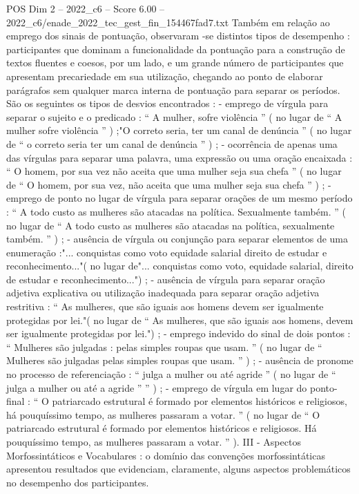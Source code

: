 \begin{textsample}{POS Dim 2 – 2022\_c6 – Score 6.00 – 2022\_c6/enade\_2022\_tec\_gest\_fin\_154467fad7.txt}
Também em relação ao emprego dos sinais de pontuação, observaram -se distintos tipos de desempenho : participantes que dominam a funcionalidade da pontuação para a construção de textos fluentes e coesos, por um lado, e um grande número de participantes que apresentam precariedade em sua utilização, chegando ao ponto de elaborar parágrafos sem qualquer marca interna de pontuação para separar os períodos.
São os seguintes os tipos de desvios encontrados : - emprego de vírgula para separar o sujeito e o predicado : “ A mulher, sofre violência ” ( no lugar de “ A mulher sofre violência ” ) ;"O correto seria, ter um canal de denúncia ” ( no lugar de “ o correto seria ter um canal de denúncia ” ) ; - ocorrência de apenas uma das vírgulas para separar uma palavra, uma expressão ou uma oração encaixada : “ O homem, por sua vez não aceita que uma mulher seja sua chefa ” ( no lugar de “ O homem, por sua vez, não aceita que uma mulher seja sua chefa ” ) ; - emprego de ponto no lugar de vírgula para separar orações de um mesmo período : “ A todo custo as mulheres são atacadas na política.
Sexualmente também. ” ( no lugar de “ A todo custo as mulheres são atacadas na política, sexualmente também. ” ) ; - ausência de vírgula ou conjunção para separar elementos de uma enumeração :"... conquistas como voto equidade salarial direito de estudar e reconhecimento..."( no lugar de"... conquistas como voto, equidade salarial, direito de estudar e reconhecimento...") ; - ausência de vírgula para separar oração adjetiva explicativa ou utilização inadequada para separar oração adjetiva restritiva : “ As mulheres, que são iguais aos homens devem ser igualmente protegidas por lei."( no lugar de “ As mulheres, que são iguais aos homens, devem ser igualmente protegidas por lei.") ; - emprego indevido do sinal de dois pontos : “ Mulheres são julgadas : pelas simples roupas que usam. ” ( no lugar de “ Mulheres são julgadas pelas simples roupas que usam. ” ) ; - ausência de pronome no processo de referenciação : “ julga a mulher ou até agride ” ( no lugar de “ julga a mulher ou até a agride ” ” ) ; - emprego de vírgula em lugar do ponto-final : “ O patriarcado estrutural é formado por elementos históricos e religiosos, há pouquíssimo tempo, as mulheres passaram a votar. ” ( no lugar de “ O patriarcado estrutural é formado por elementos históricos e religiosos.
Há pouquíssimo tempo, as mulheres passaram a votar. ” ).
III - Aspectos Morfossintáticos e Vocabulares : o domínio das convenções morfossintáticas apresentou resultados que evidenciam, claramente, alguns aspectos problemáticos no desempenho dos participantes.

\end{textsample}
